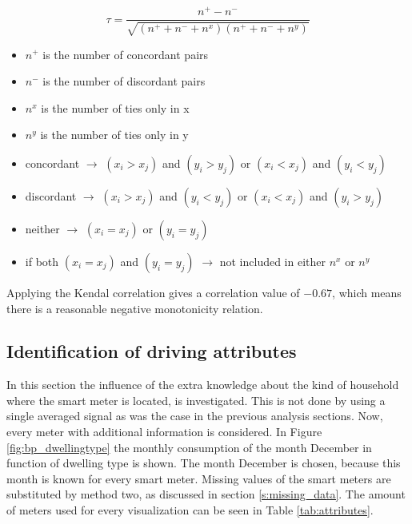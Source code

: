 \begin{equation}\label{eq:kendall}
	\tau = \frac{n^+-n^-}{\sqrt{(n^++n^-+n^x)(n^++n^-+n^y)}}
\end{equation}
\begin{itemize}
	\item $ n^+ $ is the number of concordant pairs
	\item $ n^- $ is the number of discordant pairs
	\item $ n^x $ is the number of ties only in x
	\item $ n^y $ is the number of ties only in y
	\item concordant $\rightarrow $ $ (x_i > x_j ) $ and $ (y_i > y_j ) $ or $ (x_i < x_j ) $ and $ (y_i < y_j ) $
	\item discordant $\rightarrow $ $ (x_i > x_j ) $ and $ (y_i < y_j ) $ or $ (x_i < x_j ) $ and $ (y_i > y_j ) $
	\item neither $\rightarrow $ $ (x_i = x_j ) $ or $ (y_i = y_j ) $
	\item if both $ (x_i = x_j ) $ and $ (y_i = y_j ) $ $\rightarrow $ not included in either $ n^x $ or $ n^y $
\end{itemize}

Applying the Kendal correlation  gives a correlation value of $ -0.67$, which means there is a reasonable negative monotonicity relation.\\




\subsection{Identification of driving attributes} \label{s:Identification of driving attributes}
In this section the influence of the extra knowledge about the kind of household where the smart meter is located, is investigated. This is not done by using a single averaged signal as was the case in the previous analysis sections. Now, every meter with additional information is considered. In Figure \ref{fig:bp_dwellingtype} the monthly consumption of the month December in function of dwelling type is shown. The month December is chosen, because this month is known for every smart meter. Missing values of the smart meters are substituted by method two, as discussed in section \ref{s:missing_data}. The amount of meters used for every visualization can be seen in Table \ref{tab:attributes}.

